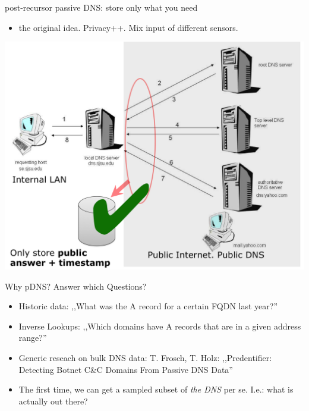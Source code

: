 \begin{frame}[t]{post-recursor passive DNS: store only what you need}
\begin{itemize}
\item the original idea. Privacy++. Mix input of different sensors.
\end{itemize}
\begin{centering}
  \vbox{}\vfill
  \includegraphics[scale=0.24]{post-recursor.png}
  \vfill
\end{centering}
\end{frame}

\begin{frame}[t]{Why pDNS? Answer which Questions?}
\begin{itemize}
\item Historic data: ,,What was the A record for a certain FQDN last year?''
\item Inverse Lookups: ,,Which domains have A records that are in a given address range?''
\item Generic reseach on bulk DNS data: T. Frosch, T. Holz: ,,Predentifier: Detecting Botnet C\&C Domains From Passive DNS Data''
\item The first time, we can get a sampled subset of \emph{the DNS} per se. I.e.: what is actually out there?
\end{itemize}
\end{frame}

